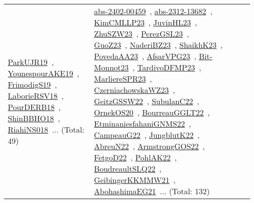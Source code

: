 {\begin{longtable}{lp{3cm}>{\raggedright\arraybackslash}p{6cm}>{\raggedright\arraybackslash}p{6cm}>{\raggedright\arraybackslash}p{8cm}}
\href{../works/ParkUJR19.pdf}{ParkUJR19}~\cite{ParkUJR19}, \href{../works/YounespourAKE19.pdf}{YounespourAKE19}~\cite{YounespourAKE19}, \href{../works/FrimodigS19.pdf}{FrimodigS19}~\cite{FrimodigS19}, \href{../works/LaborieRSV18.pdf}{LaborieRSV18}~\cite{LaborieRSV18}, \href{../works/PourDERB18.pdf}{PourDERB18}~\cite{PourDERB18}, \href{../works/ShinBBHO18.pdf}{ShinBBHO18}~\cite{ShinBBHO18}, \href{../works/RiahiNS018.pdf}{RiahiNS018}~\cite{RiahiNS018}... (Total: 49) & \href{../works/abs-2402-00459.pdf}{abs-2402-00459}~\cite{abs-2402-00459}, \href{../works/abs-2312-13682.pdf}{abs-2312-13682}~\cite{abs-2312-13682}, \href{../works/KimCMLLP23.pdf}{KimCMLLP23}~\cite{KimCMLLP23}, \href{../works/JuvinHL23.pdf}{JuvinHL23}~\cite{JuvinHL23}, \href{../works/ZhuSZW23.pdf}{ZhuSZW23}~\cite{ZhuSZW23}, \href{../works/PerezGSL23.pdf}{PerezGSL23}~\cite{PerezGSL23}, \href{../works/GuoZ23.pdf}{GuoZ23}~\cite{GuoZ23}, \href{../works/NaderiBZ23.pdf}{NaderiBZ23}~\cite{NaderiBZ23}, \href{../works/ShaikhK23.pdf}{ShaikhK23}~\cite{ShaikhK23}, \href{../works/PovedaAA23.pdf}{PovedaAA23}~\cite{PovedaAA23}, \href{../works/AfsarVPG23.pdf}{AfsarVPG23}~\cite{AfsarVPG23}, \href{../works/Bit-Monnot23.pdf}{Bit-Monnot23}~\cite{Bit-Monnot23}, \href{../works/TardivoDFMP23.pdf}{TardivoDFMP23}~\cite{TardivoDFMP23}, \href{../works/MarliereSPR23.pdf}{MarliereSPR23}~\cite{MarliereSPR23}, \href{../works/CzerniachowskaWZ23.pdf}{CzerniachowskaWZ23}~\cite{CzerniachowskaWZ23}, \href{../works/GeitzGSSW22.pdf}{GeitzGSSW22}~\cite{GeitzGSSW22}, \href{../works/SubulanC22.pdf}{SubulanC22}~\cite{SubulanC22}, \href{../works/OrnekOS20.pdf}{OrnekOS20}~\cite{OrnekOS20}, \href{../works/BourreauGGLT22.pdf}{BourreauGGLT22}~\cite{BourreauGGLT22}, \href{../works/EtminaniesfahaniGNMS22.pdf}{EtminaniesfahaniGNMS22}~\cite{EtminaniesfahaniGNMS22}, \href{../works/CampeauG22.pdf}{CampeauG22}~\cite{CampeauG22}, \href{../works/JungblutK22.pdf}{JungblutK22}~\cite{JungblutK22}, \href{../works/AbreuN22.pdf}{AbreuN22}~\cite{AbreuN22}, \href{../works/ArmstrongGOS22.pdf}{ArmstrongGOS22}~\cite{ArmstrongGOS22}, \href{../works/FetgoD22.pdf}{FetgoD22}~\cite{FetgoD22}, \href{../works/PohlAK22.pdf}{PohlAK22}~\cite{PohlAK22}, \href{../works/BoudreaultSLQ22.pdf}{BoudreaultSLQ22}~\cite{BoudreaultSLQ22}, \href{../works/GeibingerKKMMW21.pdf}{GeibingerKKMMW21}~\cite{GeibingerKKMMW21}, \href{../works/AbohashimaEG21.pdf}{AbohashimaEG21}~\cite{AbohashimaEG21}... (Total: 132)\\

\end{longtable}}
